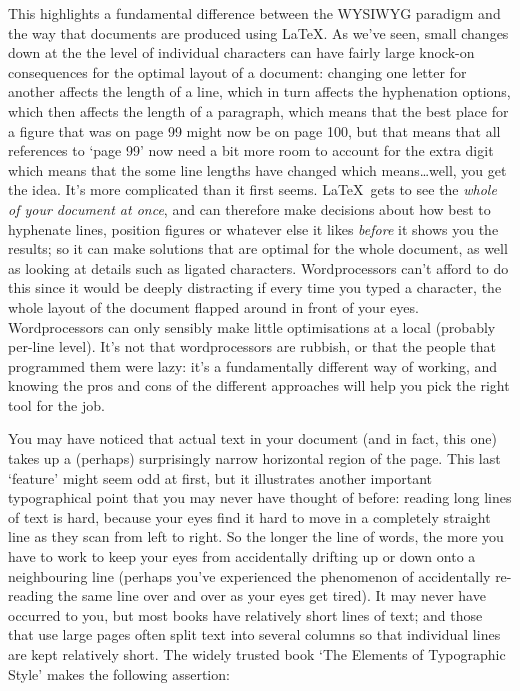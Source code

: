 \begin{refsection}
This highlights a fundamental difference between the WYSIWYG para\-digm and the way that documents are produced using \LaTeX. As we've seen, small changes down at the the level of individual characters can have fairly large knock-on consequences for the optimal layout of a document: changing one letter for another affects the length of a line, which in turn affects the hyphenation options, which then affects the length of a paragraph, which means that the best place for a figure that was on page 99 might now be on page 100, but that means that all references to `page 99' now need a bit more room to account for the extra digit which means that the some line lengths have changed which means\ldots well, you get the idea. It's more complicated than it first seems. \LaTeX\ gets to see the \emph{whole of your document at once}, and can therefore make decisions about how best to hyphenate lines,  position figures or whatever else it likes \emph{before} it shows you the results; so it can make solutions that are optimal for the whole document, as well as looking at details such as ligated characters. Wordprocessors can't afford to do this since it would be deeply distracting if every time you typed a character, the whole layout of the document flapped around in front of your eyes. Wordprocessors can only sensibly make little optimisations at a local (probably per-line level). It's not that wordprocessors are rubbish, or that the people that programmed them were lazy: it's a fundamentally different way of working, and knowing the pros and cons of the different approaches will help you pick the right tool for the job. 

You may have noticed that actual text in your document (and in fact, this one) takes up a (perhaps) surprisingly narrow horizontal region of the page. This last `feature' might seem odd at first, but it illustrates another important typographical point that you may never have thought of before: reading long lines of text is hard, because your eyes find it hard to move in a completely straight line as they scan from left to right. So the longer the line of words, the more you have to work to keep your eyes from accidentally drifting up or down onto a neighbouring line (perhaps you've experienced the phenomenon of accidentally re-reading the same line over and over as your eyes get tired). It may never have occurred to you, but most books have relatively short lines of text; and those that use large pages often split text into several columns so that individual lines are kept relatively short. The widely trusted book `The Elements of Typographic Style' \citep{bringhurst92} makes the following assertion:


\end{refsection}
